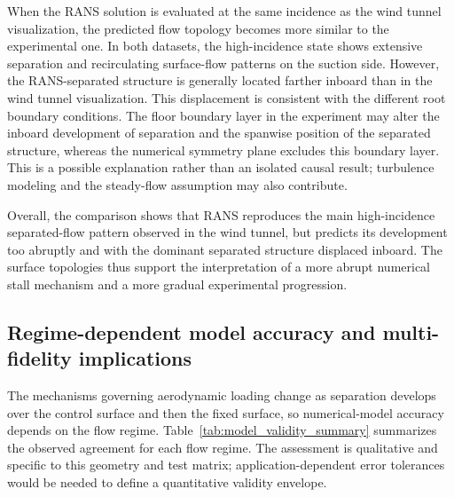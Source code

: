 \documentclass[journal ]{new-aiaa}
\begin{document}
When the RANS solution is evaluated at the same incidence as the wind tunnel visualization, the predicted flow topology becomes more similar to the experimental one.
In both datasets, the high-incidence state shows extensive separation and recirculating surface-flow patterns on the suction side.
However, the RANS-separated structure is generally located farther inboard than in the wind tunnel visualization.
This displacement is consistent with the different root boundary conditions. The floor boundary layer in the experiment may alter the inboard development of separation and the spanwise position of the separated structure, whereas the numerical symmetry plane excludes this boundary layer. This is a possible explanation rather than an isolated causal result; turbulence modeling and the steady-flow assumption may also contribute.

Overall, the comparison shows that RANS reproduces the main high-incidence separated-flow pattern observed in the wind tunnel, but predicts its development too abruptly and with the dominant separated structure displaced inboard.
The surface topologies thus support the interpretation of a more abrupt numerical stall mechanism and a more gradual experimental progression.


\subsection{Regime-dependent model accuracy and multi-fidelity implications}
\label{sec:model_accuracy_results}

The mechanisms governing aerodynamic loading change as separation develops over the control surface and then the fixed surface, so numerical-model accuracy depends on the flow regime. Table~\ref{tab:model_validity_summary} summarizes the observed agreement for each flow regime.
The assessment is qualitative and specific to this geometry and test matrix; application-dependent error tolerances would be needed to define a quantitative validity envelope.
\end{document}
